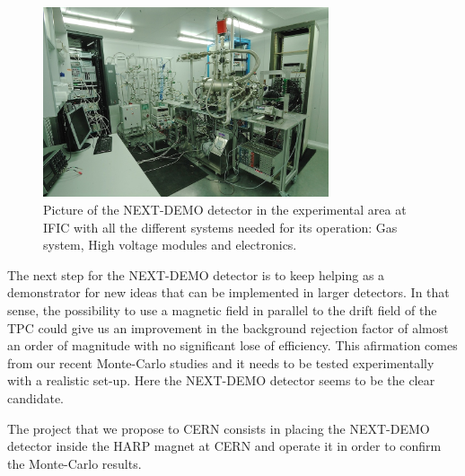 \begin{figure}
\centering
\includegraphics[width=0.75\textwidth]{img/NextDemo_cleanroom.jpg}
\caption{Picture of the NEXT-DEMO detector in the experimental area at IFIC with all the different systems needed for its operation: Gas system, High voltage modules and electronics.} \label{fig:cleanroom}
\end{figure}

The next step for the NEXT-DEMO detector is to keep helping as a demonstrator for new ideas that can be implemented in larger detectors. In that sense, the possibility to use a magnetic field in parallel to the drift field of the TPC could give us an improvement in the background rejection factor of almost an order of magnitude with no significant lose of efficiency. This afirmation comes from our recent Monte-Carlo studies and it needs to be tested experimentally with a realistic set-up. Here the NEXT-DEMO detector seems to be the clear candidate.

The project that we propose to CERN consists in placing the NEXT-DEMO detector inside the HARP magnet at CERN and operate it in order to confirm the Monte-Carlo results.
